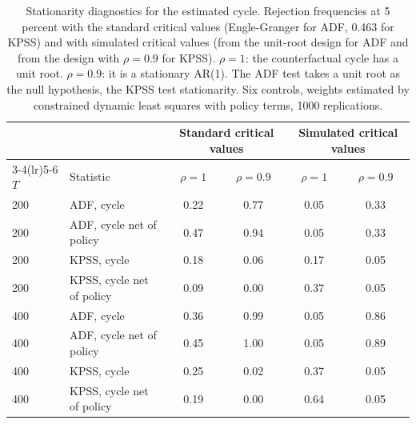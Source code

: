 \begin{table}[H]
\centering\small
\caption{Stationarity diagnostics for the estimated cycle. Rejection frequencies at 5 percent with the standard critical values (Engle-Granger for ADF, 0.463 for KPSS) and with simulated critical values (from the unit-root design for ADF and from the design with $\rho=0.9$ for KPSS). $\rho=1$: the counterfactual cycle has a unit root. $\rho=0.9$: it is a stationary AR(1). The ADF test takes a unit root as the null hypothesis, the KPSS test stationarity. Six controls, weights estimated by constrained dynamic least squares with policy terms, 1000 replications.\label{tab:mc-stat}}
\begin{tabular}{ll cc cc}
\toprule
 & & \multicolumn{2}{c}{Standard critical values} & \multicolumn{2}{c}{Simulated critical values}\\
\cmidrule(lr){3-4}\cmidrule(lr){5-6}
$T$ & Statistic & $\rho=1$ & $\rho=0.9$ & $\rho=1$ & $\rho=0.9$\\
\midrule
200 & ADF, cycle & 0.22 & 0.77 & 0.05 & 0.33\\
200 & ADF, cycle net of policy & 0.47 & 0.94 & 0.05 & 0.33\\
200 & KPSS, cycle & 0.18 & 0.06 & 0.17 & 0.05\\
200 & KPSS, cycle net of policy & 0.09 & 0.00 & 0.37 & 0.05\\
400 & ADF, cycle & 0.36 & 0.99 & 0.05 & 0.86\\
400 & ADF, cycle net of policy & 0.45 & 1.00 & 0.05 & 0.89\\
400 & KPSS, cycle & 0.25 & 0.02 & 0.37 & 0.05\\
400 & KPSS, cycle net of policy & 0.19 & 0.00 & 0.64 & 0.05\\
\bottomrule
\end{tabular}
\end{table}
